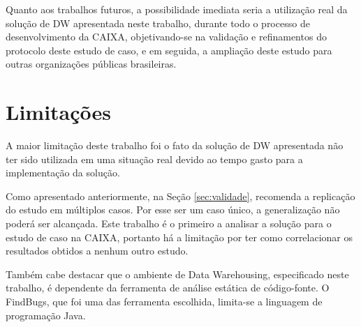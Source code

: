 Quanto aos trabalhos futuros, a possibilidade imediata seria a utilização real da solução de DW apresentada neste trabalho, durante todo o processo de desenvolvimento da CAIXA, objetivando-se na validação e refinamentos do protocolo deste estudo de caso, e em seguida, a ampliação deste estudo para outras organizações públicas brasileiras.  

\section{Limitações}

A maior limitação deste trabalho foi o fato da solução de DW apresentada não ter sido utilizada em uma situação real devido ao tempo gasto para a implementação da solução. 

Como apresentado anteriormente, na Seção \ref{sec:validade},  recomenda a replicação do estudo em múltiplos casos. Por esse ser um caso único, a generalização não poderá ser alcançada. Este trabalho é o primeiro a analisar a solução para o estudo de caso na CAIXA, portanto há a limitação por ter como correlacionar os resultados obtidos a nenhum outro estudo.

Também cabe destacar que o ambiente de Data Warehousing, especificado neste trabalho, é dependente da ferramenta de análise estática de código-fonte. O FindBugs, que foi uma das ferramenta escolhida, limita-se a linguagem de programação Java.




